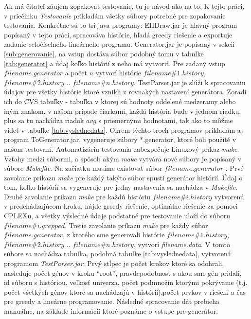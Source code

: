 Ak má čitateľ záujem zopakovať testovanie, tu je návod ako na to.
K tejto práci, v priečinku \emph{Testovanie} prikladám všetky súbory potrebné pre zopakovanie testovania.
Konkrétne sú to tri java programy: EHDraw.jar je hlavný program popísaný v tejto práci, spracováva histórie, hľadá greedy riešenie a exportuje zadanie celočíselného lineárneho programu.
Generator.jar je popísaný v sekcii \ref{sub:generovanie}, na vstup dostáva súbor podobný tomu v tabuľke \ref{tab:generator} a údaj koľko histórií z neho má vytvoriť.
Pre zadaný vstup $filename.generator$ a počet $n$ vytvorí histórie $filename\#1.history$,$filename\#2.history$ .. $filename\#n.history$.
TestParser.jar je slúži k spracovaniu údajov pre všetky histórie ktoré vznikli z rovnakých nastavení generátora. Zoradí ich do CVS tabuľky - 
tabuľka v ktorej sú hodnoty oddelené medzeramy alebo iným znakom, v našom prípade čiarkami,
každá história bude v jednom riadku, plus sa tu nachádza riadok $avg$ s priemernými hodnotami, tak ako to môžme videť v tabuľke \ref{tab:vyslednedata}.
Okrem týchto troch programov prikladám aj program ToGenerator.jar, vygeneruje súbory *.generator, ktoré boli použité v našom testovaní.
Automatizáciu testovania zabezpečuje Linuxový príkaz \emph{make}. Vzťahy medzi súbormi, a spôsob akým \emph{make} vytvára nové súbory je popísaný v súbore \emph{Makefile}.
Na začiatku musíme existovať súbor $filename.generator$ . Prvé zavolanie príkazu \emph{make} pre každý takýto súbor spustí generátor histórií.
Údaj o tom, koľko histórií sa vygeneruje pre jedny nastavenia sa nachádza v \emph{Makefile}.
Druhé zavolanie príkazu \emph{make} pre každú históriu $filename\#i.history$ vytvorenú v predchádzajúcom kroku, nájde greedy riešenie, optimálne riešenie za pomoci CPLEXu,
a všetky výsledné údaje podstatné pre testovanie uloží do súboru $filename\#i.grepped$.
Tretie zavolanie príkazu \emph{make} pre každý súbor $filename.generator$, z ktorého sme generovali histórie $filename\#1.history$,$filename\#2.history$ .. $filename\#n.history$, vytvorí \emph{filename.data}.
V tomto súbore sa nachádza tabuľka, podobná tabuľke \ref{tab:vyslednedata}, vytvorená programom \emph{TestParser.jar}.
Prvý stĺpec je počet krokov ktoré sa odohrali, nasleduje počet génov v kroku ``root'', pravdepodobnosť s akou sme gén pridali, id súboru s históriou, veľkosť univerza,
počet podmnožín ktorými pokrývame (t.j. počet všetkých génov ktoré sa nachádzajú v histórii),počet prvkov v riešení a čas pre greedy a lineárne programovanie.
Následné spracovanie dát prebieha manuálne, na základe informácií ktoré poznáme o vstupe pre generátor.

